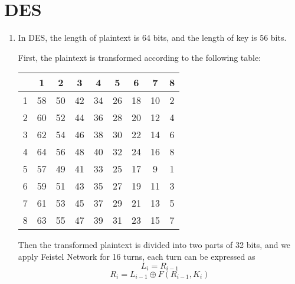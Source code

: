 \documentclass{article}
\begin{document}
\section{DES}
\begin{enumerate}
\item
In DES, the length of plaintext is 64 bits, and the length of key is 56 bits.

First, the plaintext is transformed according to the following table:
\begin{center}
\begin{tabular}{c|cccccccc}
& 1 & 2 & 3 & 4 & 5 & 6 & 7 & 8 \\
\hline
1 & 58 & 50 & 42 & 34 & 26 & 18 & 10 & 2 \\
2 & 60 & 52 & 44 & 36 & 28 & 20 & 12 & 4 \\
3 & 62 & 54 & 46 & 38 & 30 & 22 & 14 & 6 \\
4 & 64 & 56 & 48 & 40 & 32 & 24 & 16 & 8 \\
5 & 57 & 49 & 41 & 33 & 25 & 17 &  9 & 1 \\
6 & 59 & 51 & 43 & 35 & 27 & 19 & 11 & 3 \\
7 & 61 & 53 & 45 & 37 & 29 & 21 & 13 & 5 \\
8 & 63 & 55 & 47 & 39 & 31 & 23 & 15 & 7 \\
\end{tabular}
\end{center}

Then the transformed plaintext is divided into two parts of 32 bits, and we apply Feistel Network for 16 turns, each turn can be expressed as
$$L_i=R_{i-1}$$
$$R_i=L_{i-1}\oplus F(R_{i-1},K_i)$$


\end{enumerate}
\end{document}

